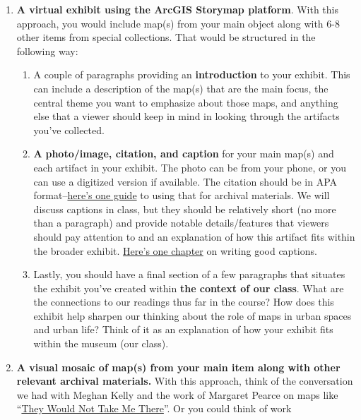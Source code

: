 \documentclass[
  letterpaper,
  DIV=11,
  numbers=noendperiod]{scrartcl}
\begin{document}
\begin{enumerate}
\def\labelenumi{\arabic{enumi}.}
\item
  \textbf{A virtual exhibit using the ArcGIS Storymap platform}. With
  this approach, you would include map(s) from your main object along
  with 6-8 other items from special collections. That would be
  structured in the following way:

  \begin{enumerate}
  \def\labelenumii{\arabic{enumii}.}
  \item
    A couple of paragraphs providing an \textbf{introduction} to your
    exhibit. This can include a description of the map(s) that are the
    main focus, the central theme you want to emphasize about those
    maps, and anything else that a viewer should keep in mind in looking
    through the artifacts you've collected.
  \item
    \textbf{A} \textbf{photo/image, citation, and caption} for your main
    map(s) and each artifact in your exhibit. The photo can be from your
    phone, or you can use a digitized version if available. The citation
    should be in APA
    format--\href{https://libguides.csudh.edu/archives-citation/apa}{here's
    one guide} to using that for archival materials. We will discuss
    captions in class, but they should be relatively short (no more than
    a paragraph) and provide notable details/features that viewers
    should pay attention to and an explanation of how this artifact fits
    within the broader exhibit.
    \href{https://drive.google.com/file/d/1QzaDQND_rpnHx2N8SHJnkhxC4VwiNM2T/view?usp=sharing}{Here's
    one chapter} on writing good captions.
  \item
    Lastly, you should have a final section of a few paragraphs that
    situates the exhibit you've created within \textbf{the context of
    our class}. What are the connections to our readings thus far in the
    course? How does this exhibit help sharpen our thinking about the
    role of maps in urban spaces and urban life? Think of it as an
    explanation of how your exhibit fits within the museum (our class).~
  \end{enumerate}
\item
  \textbf{A visual mosaic of map(s) from your main item along with other
  relevant archival materials.} With this approach, think of the
  conversation we had with Meghan Kelly and the work of Margaret Pearce
  on maps like
  ``\href{https://storymaps.arcgis.com/stories/2b5792be16d64f9e999ec93cd436bc17}{They
  Would Not Take Me There}''. Or you could think of work

\end{enumerate}
\end{document}
